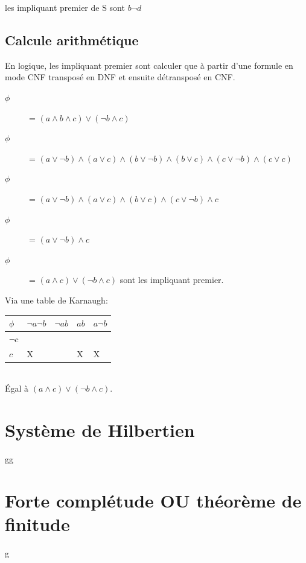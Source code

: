 les impliquant premier de S sont $b \neg d$\\

\subsection{Calcule arithmétique}
En logique, les impliquant premier sont calculer que à partir d'une formule en mode CNF transposé en DNF et ensuite détransposé en CNF.

\begin{description}
\item[$\phi$] = $(a \wedge b \wedge c) \vee ( \neg b \wedge c)$
\item[$\phi$] = $(a \vee \neg b) \wedge (a \vee c) \wedge ( b \vee \neg b) \wedge (b \vee c) \wedge (c \vee  \neg b ) \wedge (c \vee c)$
\item[$\phi$] = $(a \vee \neg b) \wedge (a \vee c) \wedge (b \vee c) \wedge (c \vee \neg b) \wedge c$
\item[$\phi$] = $(a \vee \neg b) \wedge c$
\item[$\phi$] = $(a \wedge c) \vee (\neg b \wedge c)$ sont les impliquant premier.
\end{description}

Via une table de Karnaugh:\\
\begin{tabular}{l|l|l|l|l}
  \hline
  $\phi$ & $\neg a \neg b$ & $\neg a b$ & $ab$ & $a \neg b$\\
  \hline
  $\neg c$ & $ $ & $ $ & $ $ & $ $ \\
  $c$ & X & $ $ & X & X \\
  \hline
\end{tabular}\\
Égal à $(a \wedge c) \vee (\neg b \wedge c)$.

\section{Système de Hilbertien}

gg

\section{Forte complétude OU théorème de finitude}

g

\pagebreak
